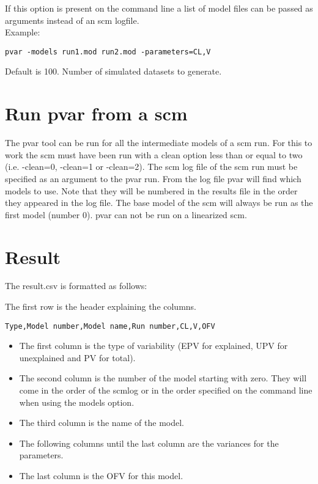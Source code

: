 \begin{optionlist}
If this option is present on the command line a list of model files can be passed as arguments instead of an scm logfile.\\ Example:
\begin{verbatim}
pvar -models run1.mod run2.mod -parameters=CL,V
\end{verbatim}
Default is 100. Number of simulated datasets to generate. 
\nextopt
\end{optionlist}

\section{Run pvar from a scm}
The pvar tool can be run for all the intermediate models of a scm run. For this to work the scm must have been run with a clean option less than or equal to two (i.e. -clean=0, -clean=1 or -clean=2). The scm log file of the scm run must be specified as an argument to the pvar run. From the log file pvar will find which models to use. Note that they will be numbered in the results file in the order they appeared in the log file. The base model of the scm will always be run as the first model (number 0). pvar can not be run on a linearized scm. 

\section{Result}

The result.csv is formatted as follows:

The first row is the header explaining the columns.
\begin{verbatim}
Type,Model number,Model name,Run number,CL,V,OFV
\end{verbatim}
\begin{itemize}
	\item The first column is the type of variability (EPV for explained, UPV for unexplained and PV for total). 
	\item The second column is the number of the model starting with zero. They will come in the order of the scmlog or in the order specified on the command line when using the models option.
	\item The third column is the name of the model. 
	\item The following columns until the last column are the variances for the parameters. 
	\item The last column is the OFV for this model.
\end{itemize}

